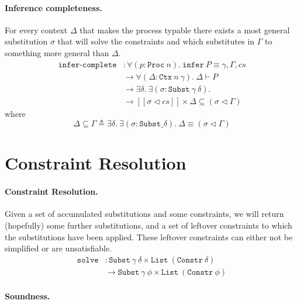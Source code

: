 \documentclass[sigplan,screen,review]{acmart}
\begin{document}
\paragraph{Inference completeness.}

For every context \(\Delta\) that makes the process typable there exists
a most general substitution \(\sigma\) that will solve the constraints
and which substitutes in \(\Gamma\) to something more general than
\(\Delta\). \[
\begin{aligned}
\texttt{infer-complete} &: \forall (p : \texttt{Proc}~n). ~ \texttt{infer}~P \equiv \gamma , \Gamma , cs \\
&\to \forall (\Delta : \texttt{Ctx}~n~\gamma). ~ \Delta \vdash P \\
&\to \exists \delta. ~ \exists (\sigma : \texttt{Subst}~\gamma~\delta). \\
&\to [\![ \sigma \triangleleft cs ]\!] \times \Delta \subseteq (\sigma \triangleleft \Gamma)
\end{aligned}
\] where \[
\Delta \subseteq \Gamma \triangleq \exists \delta. ~ \exists (\sigma : \texttt{Subst} \_ \delta). ~ \Delta \equiv (\sigma \triangleleft \Gamma)
\]

\hypertarget{constraint-resolution}{%
\section{Constraint Resolution}\label{constraint-resolution}}


\cite{McBride03}

\paragraph{Constraint Resolution.}

Given a set of accumulated substitutions and some constraints, we will
return (hopefully) some further substitutions, and a set of leftover
constraints to which the substitutions have been applied. These leftover
constraints can either not be simplified or are unsatisfiable. \[
\begin{aligned}
\texttt{solve} &: \texttt{Subst}~\gamma~\delta \times \texttt{List}~(\texttt{Constr}~\delta) \\
&\to \texttt{Subst}~\gamma~\phi \times \texttt{List}~(\texttt{Constr}~\phi)
\end{aligned}
\]

\paragraph{Soundness.}
\end{document}
